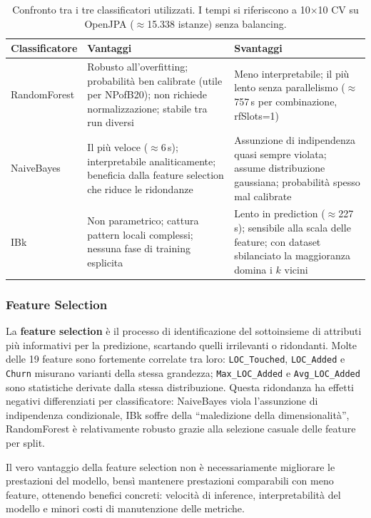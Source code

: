 \begin{table}[h!]
\centering
\small
\begin{tabular}{@{}p{}p{}p{}@{}}
\toprule
\textbf{Classificatore} & \textbf{Vantaggi} & \textbf{Svantaggi} \\
\midrule
RandomForest &
Robusto all'overfitting; probabilità ben calibrate (utile per NPofB20); non richiede
normalizzazione; stabile tra run diversi &
Meno interpretabile; il più lento senza parallelismo
($\approx$757\,s per combinazione, rfSlots=1) \\
\addlinespace
NaiveBayes &
Il più veloce ($\approx$6\,s); interpretabile analiticamente;
beneficia dalla feature selection che riduce le ridondanze &
Assunzione di indipendenza quasi sempre violata;
assume distribuzione gaussiana; probabilità spesso mal calibrate \\
\addlinespace
IBk &
Non parametrico; cattura pattern locali complessi;
nessuna fase di training esplicita &
Lento in prediction ($\approx$227\,s); sensibile alla scala delle feature;
con dataset sbilanciato la maggioranza domina i $k$ vicini \\
\bottomrule
\end{tabular}
\caption{Confronto tra i tre classificatori utilizzati. I tempi si riferiscono a
10$\times$10 CV su OpenJPA ($\approx$15.338 istanze) senza balancing.}
\end{table}

\subsubsection{Feature Selection}

La \textbf{feature selection} è il processo di identificazione del sottoinsieme di
attributi più informativi per la predizione, scartando quelli irrilevanti o ridondanti.
Molte delle 19 feature sono fortemente correlate tra loro: \texttt{LOC\_Touched},
\texttt{LOC\_Added} e \texttt{Churn} misurano varianti della stessa grandezza;
\texttt{Max\_LOC\_Added} e \texttt{Avg\_LOC\_Added} sono statistiche derivate dalla
stessa distribuzione. Questa ridondanza ha effetti negativi differenziati per
classificatore: NaiveBayes viola l'assunzione di indipendenza condizionale, IBk soffre
della ``maledizione della dimensionalità'', RandomForest è relativamente robusto grazie
alla selezione casuale delle feature per split.

Il vero vantaggio della feature selection non è necessariamente migliorare le prestazioni
del modello, bensì mantenere prestazioni comparabili con meno feature, ottenendo benefici
concreti: velocità di inference, interpretabilità del modello e minori costi di
manutenzione delle metriche.

